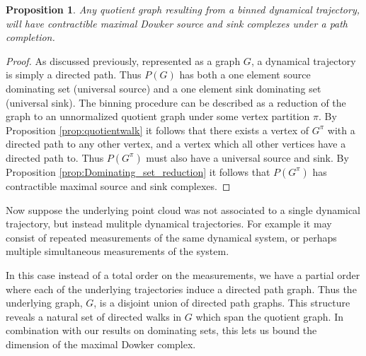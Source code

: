 \documentclass[pdflatex,bst/sn-mathphys-num]{sn-jnl}%
\newcommand{\toti}[1] {{\textcolor{pink}{{\sf Tobias: } #1}}}
\theoremstyle{thmstyleone}%
\newtheorem{prop}[theorem]{Proposition}%
\theoremstyle{definition}
\newtheorem{cor}[theorem]{Corollary}
\theoremstyle{thmstyletwo}%
\theoremstyle{thmstylethree}%
\begin{document}
\begin{prop}
    Any quotient graph resulting from a binned dynamical trajectory, will have contractible maximal Dowker source and sink complexes under a path completion.
\end{prop}
\begin{proof}
    As discussed previously, represented as a graph $G$, a dynamical trajectory is simply a directed path. Thus $P(G)$ has both a one element source dominating set (universal source) and a one element sink dominating set (universal sink). The binning procedure can be described as a reduction of the graph to an unnormalized quotient graph under some vertex partition $\pi$. By Proposition \ref{prop:quotientwalk} it follows that there exists a vertex of $G^\pi$ with a directed path to any other vertex, and a vertex which all other vertices have a directed path to. Thus $P(G^\pi)$ must also have a universal source and sink. By Proposition \ref{prop:Dominating_set_reduction} it follows that $P(G^\pi)$ has contractible maximal source and sink complexes.
\end{proof}


Now suppose the underlying point cloud was not associated to a single dynamical trajectory, but instead mulitple dynamical trajectories. For example it may consist of repeated measurements of the same dynamical system, or perhaps multiple simultaneous measurements of the system. 

In this case instead of a total order on the measurements, we have a partial order where each of the underlying trajectories induce a directed path graph. Thus the underlying graph, $G$, is a disjoint union of directed path graphs. This structure reveals a natural set of directed walks in $G$ which span the quotient graph. In combination with our results on dominating sets, this lets us bound the dimension of the maximal Dowker complex.


\end{document}
